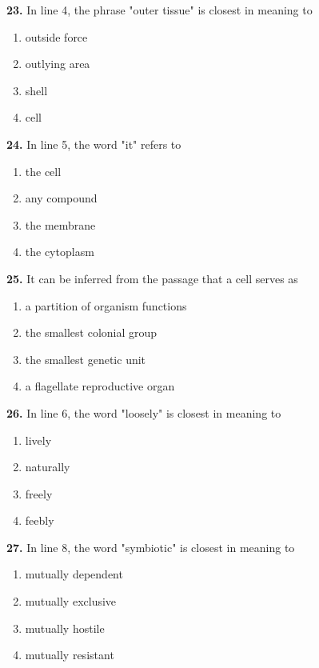\documentclass[12pt]{article}
\begin{document}
\par
\vspace{0.25\baselineskip}
\noindent\textbf{23.} In line 4, the phrase "outer tissue" is closest in meaning to
\begin{enumerate}[label=(\Alph*),leftmargin=*,itemsep=0.2em]
\item outside force
\item outlying area
\item shell
\item cell
\end{enumerate}
\par
\vspace{0.25\baselineskip}
\noindent\textbf{24.} In line 5, the word "it" refers to
\begin{enumerate}[label=(\Alph*),leftmargin=*,itemsep=0.2em]
\item the cell
\item any compound
\item the membrane
\item the cytoplasm
\end{enumerate}
\par
\vspace{0.25\baselineskip}
\noindent\textbf{25.} It can be inferred from the passage that a cell serves as
\begin{enumerate}[label=(\Alph*),leftmargin=*,itemsep=0.2em]
\item a partition of organism functions
\item the smallest colonial group
\item the smallest genetic unit
\item a flagellate reproductive organ
\end{enumerate}
\par
\vspace{0.25\baselineskip}
\noindent\textbf{26.} In line 6, the word "loosely" is closest in meaning to
\begin{enumerate}[label=(\Alph*),leftmargin=*,itemsep=0.2em]
\item lively
\item naturally
\item freely
\item feebly
\end{enumerate}
\par
\vspace{0.25\baselineskip}
\noindent\textbf{27.} In line 8, the word "symbiotic" is closest in meaning to
\begin{enumerate}[label=(\Alph*),leftmargin=*,itemsep=0.2em]
\item mutually dependent
\item mutually exclusive
\item mutually hostile
\item mutually resistant
\end{enumerate}
\end{document}
